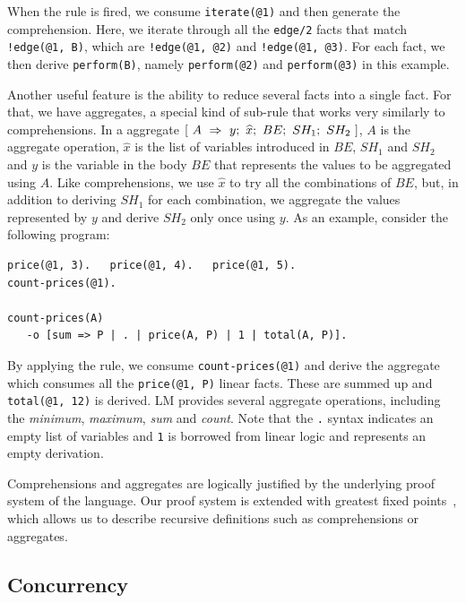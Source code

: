 When the rule is fired, we consume \texttt{iterate(@1)} and then
generate the comprehension. Here, we iterate through all the
\texttt{edge/2} facts that match \texttt{!edge(@1, B)}, which are
\texttt{!edge(@1, @2)} and \texttt{!edge(@1, @3)}. For each fact, we
then derive \texttt{perform(B)}, namely \texttt{perform(@2)} and
\texttt{perform(@3)} in this example.

Another useful feature is the ability to reduce several facts into a
single fact. For that, we have aggregates, a special kind of sub-rule
that works very similarly to comprehensions. In a aggregate
$[~A~\Rightarrow~y;~\widehat{x};~BE;~SH_1;~SH_2~]$, $A$ is the aggregate operation, $\widehat{x}$ is the
list of variables introduced in $BE$, $SH_1$ and $SH_2$ and $y$ is the
variable in the body $BE$ that represents the values to be aggregated
using $A$. Like comprehensions, we use $\widehat{x}$ to try all the
combinations of $BE$, but, in addition to deriving $SH_1$ for each
combination, we aggregate the values represented by $y$ and derive
$SH_2$ only once using $y$. As an example, consider the following
program:

{\footnotesize
\begin{Verbatim}
price(@1, 3).   price(@1, 4).   price(@1, 5).
count-prices(@1).

count-prices(A)
   -o [sum => P | . | price(A, P) | 1 | total(A, P)].
\end{Verbatim}
}

By applying the rule, we consume \texttt{count-prices(@1)} and derive
the aggregate which consumes all the \texttt{price(@1, P)} linear
facts. These are summed up and \texttt{total(@1,~12)} is derived. LM
provides several aggregate operations, including the \emph{minimum},
\emph{maximum}, \emph{sum} and \emph{count}. Note that the \texttt{.} syntax indicates
an empty list of variables and \texttt{1} is borrowed from linear logic
and represents an empty derivation.

Comprehensions and aggregates are logically justified by the underlying
proof system of the language. Our proof system is extended with greatest
fixed points~\cite{Baelde:2012:LGF:2071368.2071370}, which allows us to describe
recursive definitions such as comprehensions or aggregates.


\subsection{Concurrency}

